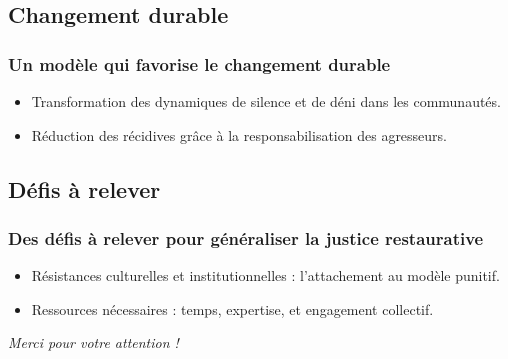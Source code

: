 \documentclass[french]{beamer}
\begin{document}
\subsection{Changement durable}
\begin{frame}
  \frametitle{Un modèle qui favorise le changement durable}
  \begin{itemize}
    \item Transformation des dynamiques de silence et de déni dans les communautés.
    \item Réduction des récidives grâce à la responsabilisation des agresseurs.
  \end{itemize}
\end{frame}

\subsection{Défis à relever}
\begin{frame}
  \frametitle{Des défis à relever pour généraliser la justice restaurative}
  \begin{itemize}
    \item Résistances culturelles et institutionnelles : l’attachement au modèle punitif.
    \item Ressources nécessaires : temps, expertise, et engagement collectif.
  \end{itemize}
\end{frame}

\begin{frame}[plain]
  \addtocounter{framenumber}{-1}
  \begin{center}
    \huge
    \textit{Merci pour votre attention !}
  \end{center}
\end{frame}
\end{document}
